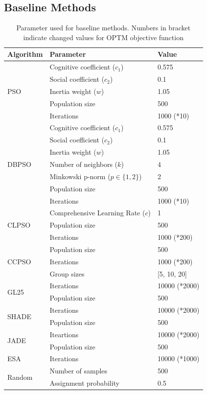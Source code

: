 \subsection{Baseline Methods}

\begin{table}[htbp]
\centering
\caption{Parameter used for baseline methods. Numbers in bracket indicate changed values for OPTM objective function}
\label{tab:baseline_parameters}
\begin{tabular}{|p{}|p{}|p{}|}
\hline
\textbf{Algorithm} & \textbf{Parameter} & \textbf{Value} \\
\hline
\multirow{5}{*}{PSO} & Cognitive coefficient ($c_1$) & 0.575 \\
 & Social coefficient ($c_2$) & 0.1 \\
 & Inertia weight ($w$) & 1.05 \\
 & Population size & 500 \\
 & Iterations & 1000 (*10) \\
\hline
\multirow{7}{*}{DBPSO} & Cognitive coefficient ($c_1$) & 0.575 \\
 & Social coefficient ($c_2$) & 0.1 \\
 & Inertia weight ($w$) & 1.05 \\
 & Number of neighbors ($k$) & 4 \\
 & Minkowski p-norm ($p \in \{1,2\}$) & 2 \\
 & Population size & 500 \\
 & Iterations & 1000 (*10) \\
\hline
\multirow{3}{*}{CLPSO} & Comprehensive Learning Rate ($c$) & 1 \\
 & Population size & 500 \\
 & Iterations & 1000 (*200) \\
\hline
\multirow{3}{*}{CCPSO}
 & Population size & 500  \\
 & Iterations & 1000 (*200) \\
 & Group sizes & [5, 10, 20] \\
\hline
\multirow{2}{*}{GL25} & Iterations & 10000 (*2000)\\
 & Population size & 500 \\
\hline
\multirow{2}{*}{SHADE} & Iterations & 10000  (*2000)\\
 & Population size & 500 \\
\hline
\multirow{2}{*}{JADE} & Iteartions & 10000 (*2000)\\
 & Population size & 500 \\
\hline
{ESA} & Iterations & 10000 (*1000) \\
\hline
\multirow{2}{*}{Random} & Number of samples & 500 \\
 & Assignment probability & 0.5 \\
\hline
\end{tabular}
\end{table}

